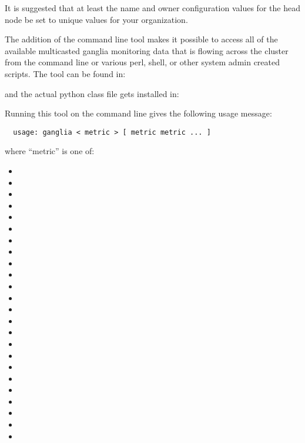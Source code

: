 It is suggested that at least the name and owner configuration values
for the head node be set to unique values for your organization.

The addition of the  command line tool makes it possible
to access all of the available multicasted ganglia monitoring data
that is flowing across the cluster from the command line or various
perl, shell, or other system admin created scripts.  The tool can be
found in:

\vspace{10pt}
\centerline{}
\vspace{10pt}

\noindent and the actual python class file gets installed in:

\vspace{10pt}
\centerline{}
\vspace{10pt}

Running this tool on the command line gives the following usage
message:

\begin{verbatim}
  usage: ganglia < metric > [ metric metric ... ]
\end{verbatim}

where ``metric'' is one of:

\begin{itemize}
\item {}
\item {}
\item {}
\item {}
\item {}
\item {}
\item {}
\item {}
\item {}
\item {}
\item {}
\item {}
\item {}
\item {}
\item {}
\item {}
\item {}
\item {}
\item {}
\item {}
\item {}
\item {}
\item {}
\item {}
\end{itemize}

